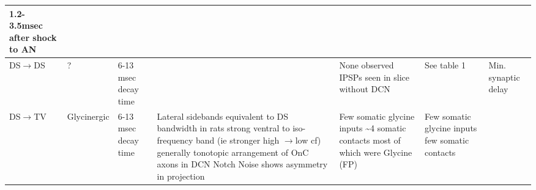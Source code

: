 \documentclass[10pt,a4paper]{article}
\begin{document}
\begin{landscape}
\begin{supertabular}{|m{2.121cm}|m{2.899cm}|m{2.243cm}|m{2.986cm}|m{2.294cm}|m{2.245cm}|m{3.303cm}|}
\citep{FerragamoGoldingEtAl:1998a,NeedhamPaolini:2003} 1.2-3.5msec after
shock to AN \citep{Oertel:1983}\\\hline
                      DS\ensuremath{\rightarrow}DS                        & 
                   \citep{FerragamoGoldingEtAl:1998a}?                    & 6-13 msec decay time
\citep{AwatramaniTurecekEtAl:2005,HartyManis:1996,HartyManis:1998,LeaoOleskevichEtAl:2004}
                                                                          &                                            & None observed \citep{SmithRhode:1989} IPSPs seen in slice without DCN
                   \citep{FerragamoGoldingEtAl:1998a}                     &    See table 1 \citep{SmithRhode:1989}     & 
Min. synaptic delay \\\hline
                      DS\ensuremath{\rightarrow}TV                        & Glycinergic
\citep{DoucetRyugoEtAl:1999,OertelWuEtAl:1990,OstapoffMorestEtAl1999,SpirouDavisEtAl:1999,ZhangOertel:1993}
                                                                          & 

6-13 msec decay time
\citep{AwatramaniTurecekEtAl:2005,FerragamoGoldingEtAl:1998a,HartyManis:1996,HartyManis:1998,LeaoOleskevichEtAl:2004}
                                                                          & Lateral sidebands equivalent to DS bandwidth
\citep{OstapoffMorestEtAl:1999,SpirouDavisEtAl:1999} in rats strong ventral
to iso-frequency band (ie stronger high \ensuremath{\rightarrow}low cf)
\citep{DoucetRyugoEtAl:1999,FriedlandPongstapornEtAl:2003} generally
tonotopic arrangement of OnC axons in DCN \citep{ArnottWallaceEtAl:2004}
    Notch Noise shows asymmetry in projection\citep{ReissYoung:2005}      & Few
somatic glycine inputs
\citep{OsenOttersenEtAl:1990,OstapoffMorestEtAl1999:1999,ZhangOertel:1993}
\~{}4 somatic contacts most of which were Glycine (FP) \citep{Alibardi:1999}
                                                                          & Few somatic glycine inputs
\citep{OsenOttersenEtAl:1990,OstapoffMorestEtAl:1999,ZhangOertel:1993} few
                 somatic contacts \citep{Alibardi:1999}                   & 


\end{supertabular}
\end{landscape}
\end{document}
